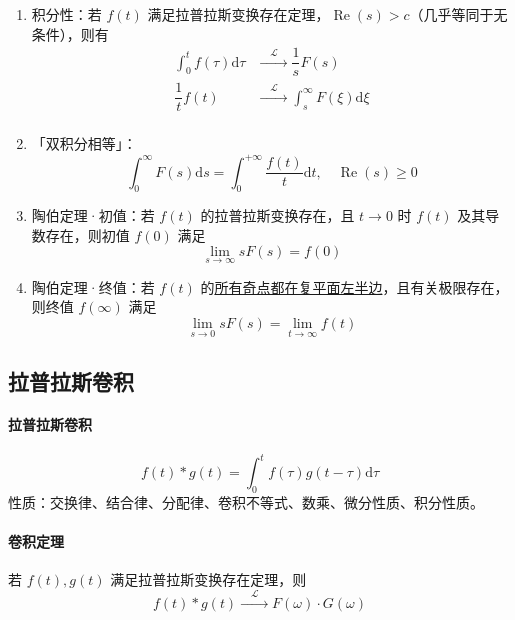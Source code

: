 \documentclass[UTF8]{ctexart}
\renewcommand\d{\mathrm{d}}
\newcommand\w{\omega}
\newcommand\lbh{\xrightarrow{\quad \mathcal{L} \quad}} %
\renewcommand\Re{\operatorname{Re}}
\begin{document}
\begin{mybox}
\begin{enumerate}[itemsep=0pt]
    \item 积分性：若 $f(t)$ 满足拉普拉斯变换存在定理，$\Re(s)>c$（几乎等同于无条件），则有
    \begin{equation*}\begin{aligned}
        \int_0^t f(\tau)\d\tau &\lbh \dfrac1s F(s) \\
        \dfrac1t f(t) &\lbh \int_s^\infty F(\xi)\d\xi \\
    \end{aligned}\end{equation*}

    \item 「双积分相等」：
    \begin{equation*}
        \int_0^\infty F(s)\d s = \int_0^{+\infty} \dfrac{f(t)}{t}\d t,\quad \Re(s)\geqslant 0
    \end{equation*}

    \item 陶伯定理·初值：若 $f(t)$ 的拉普拉斯变换存在，且 $t\to 0$ 时 $f(t)$ 及其导数存在，则初值 $f(0)$ 满足
    \begin{equation*}
        \lim\limits_{s\to\infty} sF(s) = f(0)
    \end{equation*}

    \item 陶伯定理·终值：若 $f(t)$ 的\underline{所有奇点都在复平面左半边}，且有关极限存在，则终值 $f(\infty)$ 满足
    \begin{equation*}
        \lim\limits_{s\to 0} sF(s) = \lim\limits_{t\to\infty} f(t)
    \end{equation*}
\end{enumerate}

\end{mybox}

\subsection{拉普拉斯卷积}
\paragraph{拉普拉斯卷积}
\begin{equation*}
    f(t)*g(t) = \int_0^t f(\tau)g(t-\tau)\d\tau
\end{equation*}
性质：交换律、结合律、分配律、卷积不等式、数乘、微分性质、积分性质。

\paragraph{卷积定理}  若 $f(t),g(t)$ 满足拉普拉斯变换存在定理，则
\begin{equation}
    f(t)*g(t)\lbh F(\w)\cdot G(\w)
\end{equation}
\end{document}
